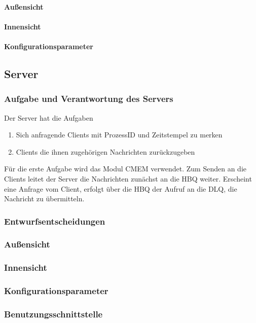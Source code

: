 \documentclass{article}
\begin{document}
			\paragraph{Außensicht}
			\paragraph{Innensicht}
			\paragraph{Konfigurationsparameter}
			
	\subsection{Server}
	
		\subsubsection{Aufgabe und Verantwortung des Servers}
			Der Server hat die Aufgaben  
			\begin{enumerate}
    			\item{Sich anfragende Clients mit ProzessID und Zeitstempel zu merken}
    			\item{Clients die ihnen zugehörigen Nachrichten zurückzugeben}
			\end{enumerate}
			Für die erste Aufgabe wird das Modul CMEM verwendet. 
			Zum Senden an die Clients leitet der Server die Nachrichten zunächst an die HBQ weiter. 
			Erscheint eine Anfrage vom Client, erfolgt über die HBQ der Aufruf an die DLQ, 
			die Nachricht zu übermitteln.
		\subsubsection{Entwurfsentscheidungen}
		\subsubsection{Außensicht}
		\subsubsection{Innensicht}
		\subsubsection{Konfigurationsparameter}
		\subsubsection{Benutzungsschnittstelle}
		
\end{document}
